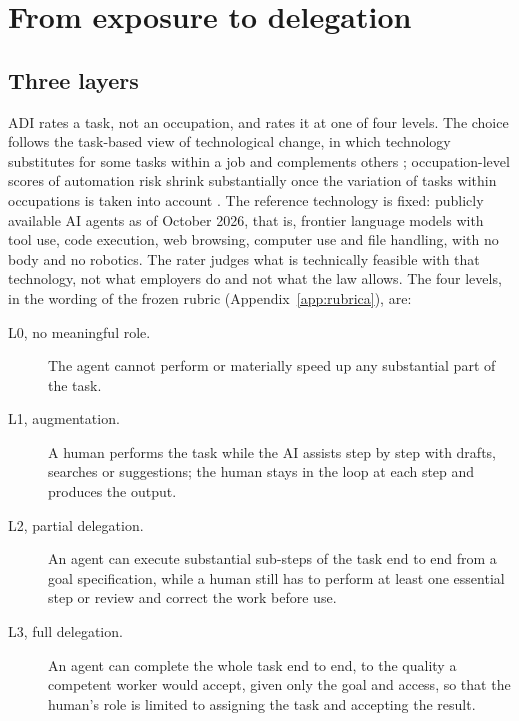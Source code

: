 \section{From exposure to delegation}
\label{sec:delegacion}

\subsection{Three layers}
\label{sec:capas}

ADI rates a task, not an occupation, and rates it at one of four levels.
The choice follows the task-based view of technological change, in which technology substitutes for some tasks within a job and complements others \citep{autor2003skill, acemoglu2011skills, autor2015why}; occupation-level scores of automation risk shrink substantially once the variation of tasks within occupations is taken into account \citep{arntz2016risk, nedelkoska2018automation}.
The reference technology is fixed: publicly available AI agents as of October 2026, that is, frontier language models with tool use, code execution, web browsing, computer use and file handling, with no body and no robotics.
The rater judges what is technically feasible with that technology, not what employers do and not what the law allows.
The four levels, in the wording of the frozen rubric (Appendix~\ref{app:rubrica}), are:

\begin{description}
  \item[L0, no meaningful role.] The agent cannot perform or materially speed up any substantial part of the task.
  \item[L1, augmentation.] A human performs the task while the AI assists step by step with drafts, searches or suggestions; the human stays in the loop at each step and produces the output.
  \item[L2, partial delegation.] An agent can execute substantial sub-steps of the task end to end from a goal specification, while a human still has to perform at least one essential step or review and correct the work before use.
  \item[L3, full delegation.] An agent can complete the whole task end to end, to the quality a competent worker would accept, given only the goal and access, so that the human's role is limited to assigning the task and accepting the result.
\end{description}

